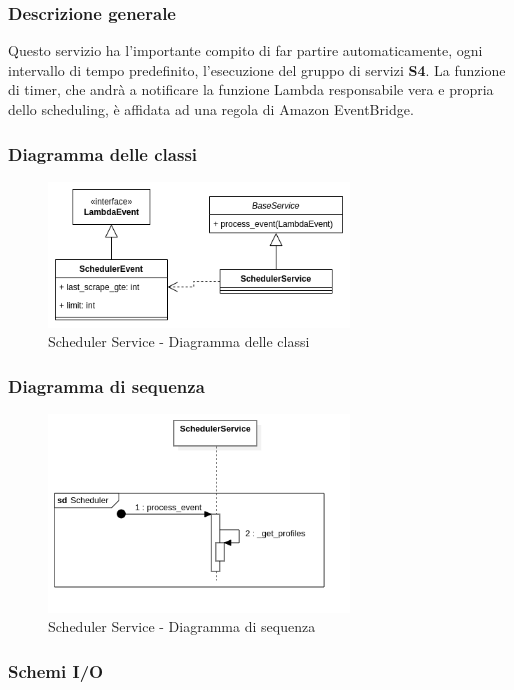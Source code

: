 \subsubsection{Descrizione generale}
Questo servizio ha l'importante compito di far partire automaticamente,
ogni intervallo di tempo predefinito, l'esecuzione del gruppo di servizi \textbf{S4}.
La funzione di timer, che andrà a notificare la funzione Lambda responsabile vera e propria dello
scheduling, è affidata ad una regola di Amazon EventBridge.

\subsubsection{Diagramma delle classi}
\begin{figure}[H]
    \includegraphics[width=8cm]{sezioni/images/cd_scheduler.png}
    \centering
    \caption{Scheduler Service - Diagramma delle classi}
\end{figure}

\subsubsection{Diagramma di sequenza}
\begin{figure}[H]
    \includegraphics[width=8cm]{sezioni/images/sd_scheduler.png}
    \centering
    \caption{Scheduler Service - Diagramma di sequenza}
\end{figure}

\subsubsection{Schemi I/O}
